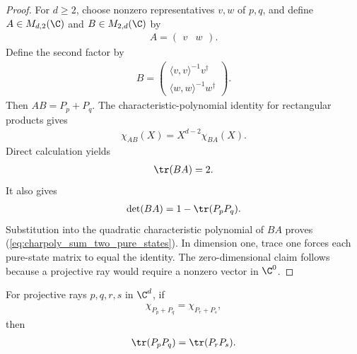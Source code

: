 \begin{proof}\leanok
    For $d\geq2$, choose nonzero representatives $v,w$ of $p,q$, and define
    $A\in M_{d,2}(\C)$ and $B\in M_{2,d}(\C)$ by
    \begin{align}
        A=\begin{pmatrix}v&w\end{pmatrix}.
    \end{align}
    Define the second factor by
    \begin{align}
        B=\begin{pmatrix}
          \langle v,v\rangle^{-1}v^\dagger\\
          \langle w,w\rangle^{-1}w^\dagger
        \end{pmatrix}.
    \end{align}
    Then $AB=P_p+P_q$. The characteristic-polynomial identity for rectangular
    products gives
    \begin{align}
        \chi_{AB}(X)=X^{d-2}\chi_{BA}(X).
    \end{align}
    Direct calculation yields
    \begin{align}
        \tr(BA)=2.
    \end{align}
    It also gives
    \begin{align}
        \det(BA)=1-\tr(P_pP_q).
    \end{align}
    Substitution into the quadratic characteristic polynomial of $BA$ proves
    (\ref{eq:charpoly_sum_two_pure_states}). In dimension one, trace one forces
    each pure-state matrix to equal the identity. The zero-dimensional claim
    follows because a projective ray would require a nonzero vector in
    $\C^0$.
\end{proof}

\begin{theorem}
    \label{thm:transition_probability_of_sum_charpoly}
    \leanok
    For projective rays $p,q,r,s$ in $\C^d$, if
    \begin{align}
        \chi_{P_p+P_q}=\chi_{P_r+P_s},
    \end{align}
    then
    \begin{align}
        \tr(P_pP_q)=\tr(P_rP_s).
    \end{align}
\end{theorem}

